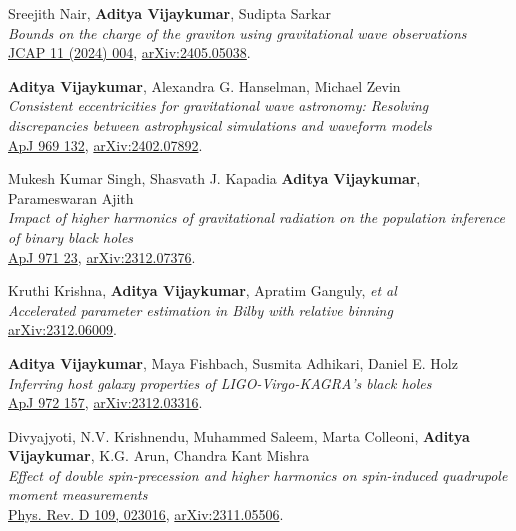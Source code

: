 \begin{etaremune}
	\item
	Sreejith Nair, \primary \textbf{Aditya Vijaykumar}, Sudipta Sarkar  \\
	\textit{Bounds on the charge of the graviton using gravitational wave observations}\\
	\href{https://iopscience.iop.org/article/10.1088/1475-7516/2024/11/004}{JCAP 11 (2024) 004}, \href{https://arxiv.org/abs/2405.05038}{arXiv:2405.05038}.
	
	\item
	\primary \textbf{Aditya Vijaykumar}, Alexandra G. Hanselman, Michael Zevin  \\
	\textit{Consistent eccentricities for gravitational wave astronomy: Resolving discrepancies between astrophysical simulations and waveform models}\\
	\href{https://iopscience.iop.org/article/10.3847/1538-4357/ad4455}{ApJ 969 132}, \href{https://arxiv.org/abs/2402.07892}{arXiv:2402.07892}.

	\item
	Mukesh Kumar Singh, Shasvath J. Kapadia \textbf{Aditya Vijaykumar}, Parameswaran Ajith  \\
	\textit{Impact of higher harmonics of gravitational radiation on the population inference of binary black holes}\\
	\href{https://iopscience.iop.org/article/10.3847/1538-4357/ad499b}{ApJ 971 23}, \href{https://arxiv.org/abs/2312.07376}{arXiv:2312.07376}.

	\item
	\student Kruthi Krishna, \primary \textbf{Aditya Vijaykumar}, Apratim Ganguly, \textit{et al}  \\
	\textit{Accelerated parameter estimation in Bilby with relative binning}\\
	\href{https://arxiv.org/abs/2312.06009}{arXiv:2312.06009}.

    \item
	\textbf{Aditya Vijaykumar}, Maya Fishbach, Susmita Adhikari, Daniel E. Holz  \\
	\textit{Inferring host galaxy properties of LIGO-Virgo-KAGRA's black holes
}\\
	\href{https://iopscience.iop.org/article/10.3847/1538-4357/ad6140}{ApJ 972 157}, \href{https://arxiv.org/abs/2312.03316}{arXiv:2312.03316}.

	\item
	Divyajyoti, N.V. Krishnendu, Muhammed Saleem, Marta Colleoni, \textbf{Aditya Vijaykumar}, K.G. Arun, Chandra Kant Mishra  \\
	\textit{Effect of double spin-precession and higher harmonics on spin-induced quadrupole moment measurements}\\
	\href{https://journals.aps.org/prd/abstract/10.1103/PhysRevD.109.023016}{Phys. Rev. D 109, 023016}, \href{https://arxiv.org/abs/2311.05506}{arXiv:2311.05506}.


\end{etaremune}
